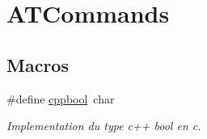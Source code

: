 \hypertarget{group___a_t_commands}{\section{A\-T\-Commands}
\label{group___a_t_commands}
}
\subsection*{Macros}
\begin{DoxyCompactItemize}
\item 
\#define \hyperlink{group___a_t_commands_ga58b930fb43c5cd2fc89a84647e6fe51c}{cppbool}~char
\begin{DoxyCompactList}\small\item\em Implementation du type c++ bool en c. \end{DoxyCompactList}\end{DoxyCompactItemize}
